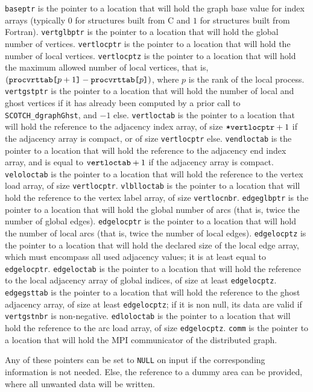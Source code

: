 \begin{itemize}
{\tt baseptr} is the pointer to a location that will hold the graph base
value for index arrays (typically $0$ for
structures built from C and $1$ for structures built from Fortran).
{\tt vertglbptr} is the pointer to a location that will hold the
global number of vertices.
{\tt vertlocptr} is the pointer to a location that will hold the
number of local vertices.
{\tt vertlocptz} is the pointer to a location that will hold the
maximum allowed number of local vertices, that is,
$(\mbox{\tt proc\lbt vrt\lbt tab[}p + 1\mbox{\tt]} -
\mbox{\tt proc\lbt vrt\lbt tab[}p\mbox{\tt]})$, where $p$ is the
rank of the local process.
{\tt vertgstptr} is the pointer to a location that will hold the
number of local and ghost vertices if it has already been computed
by a prior call to {\tt SCOTCH\_\lbt dgraph\lbo Ghst}, and $-1$ else.
{\tt vertloctab} is the pointer to a location that will hold the
reference to the adjacency index array, of size
$\mbox{\tt *vertlocptr} + 1$ if the adjacency array is compact,
or of size {\tt *vertlocptr} else.
{\tt vendloctab} is the pointer to a location that will hold the
reference to the adjacency end index array, and is equal to
$\mbox{\tt vertloctab} + 1$ if the adjacency array is compact.
{\tt veloloctab} is the pointer to a location that will hold the
reference to the vertex load array, of size {\tt *vertlocptr}.
{\tt vlblloctab} is the pointer to a location that will hold the
reference to the vertex label array, of size {\tt vertlocnbr}.
{\tt edgeglbptr} is the pointer to a location that will hold the
global number of arcs (that is, twice the number of global edges).
{\tt edgelocptr} is the pointer to a location that will hold the
number of local arcs (that is, twice the number of local edges).
{\tt edgelocptz} is the pointer to a location that will hold the
declared size of the local edge array, which must encompass all
used adjacency values; it is at least equal to {\tt *edgelocptr}.
{\tt edgeloctab} is the pointer to a location that will hold the
reference to the local adjacency array of global indices, of size
at least {\tt *edgelocptz}.
{\tt edgegsttab} is the pointer to a location that will hold the
reference to the ghost adjacency array, of size at least
{\tt *edgelocptz}; if it is non null, its data are valid if
{\tt vertgstnbr} is non-negative.
{\tt edloloctab} is the pointer to a location that will hold the
reference to the arc load array, of size {\tt *edgelocptz}.
{\tt comm} is the pointer to a location that will hold the MPI
communicator of the distributed graph.

Any of these pointers can be set to {\tt NULL} on input if the
corresponding information is not needed. Else, the reference to a
dummy area can be provided, where all unwanted data will be written.


\end{itemize}
